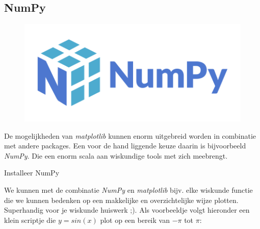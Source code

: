 \newpage

\subsection{NumPy}

\begin{figure}[h!]
\centering\includegraphics[scale=0.5]{Pictures/chapter07/numpy_logo.png}
\label{fig:numpylogo} %
\end{figure}

De mogelijkheden van \textit{matplotlib} kunnen enorm uitgebreid worden in combinatie met andere packages. Een voor de hand liggende keuze daarin is bijvoorbeeld \textit{NumPy}. Die een enorm scala aan wiskundige tools met zich meebrengt. 

\begin{exercise}
Installeer NumPy 
\end{exercise}
We kunnen met de combinatie \textit{NumPy} en \textit{matplotlib} bijv. elke wiskunde functie die we kunnen bedenken op een makkelijke en overzichtelijke wijze plotten. Superhandig voor je wiskunde huiswerk ;). Als voorbeeldje volgt hieronder een klein scriptje die $y = sin(x)$ plot op een bereik van $-\pi$ tot $\pi$:

\newpage


